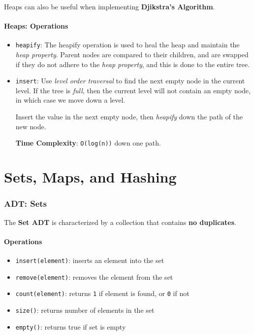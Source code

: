\documentclass[12pt, letterpaper]{article}
\begin{document}
Heaps can also be useful when implementing \textbf{Djikstra's Algorithm}.

\subsection*{Heaps: Operations}

\begin{itemize}
    \item \texttt{heapify}: The heapify operation is used to heal the heap and maintain the \textit{heap property}. Parent nodes are compared to their children, and are swapped if they do not adhere to the \textit{heap property}, and this is done to the entire tree.
    \item \texttt{insert}: Use \textit{level order traversal} to find the next empty node in the current level. If the tree is \textit{full}, then the current level will not contain an empty node, in which case we move down a level.
        \medskip

        Insert the value in the next empty node, then \textit{heapify} down the path of the new node.
        \bigskip

        \textbf{Time Complexity}: \texttt{O(log(n))} down one path.

\end{itemize}

\part{Sets, Maps, and Hashing}

\section*{ADT: Sets}

The \textbf{Set ADT} is characterized by a collection that contains \textbf{no duplicates}.

\subsection*{Operations}
\begin{itemize}
    \item \texttt{insert(element)}: inserts an element into the set
    \item \texttt{remove(element)}: removes the element from the set
    \item \texttt{count(element)}: returns \texttt{1} if element is found, or \texttt{0} if not
    \item \texttt{size()}: returns number of elements in the set
    \item \texttt{empty()}: returns true if set is empty
\end{itemize}
\end{document}
